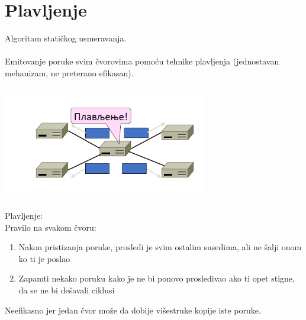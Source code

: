 \documentclass{article} %
\begin{document}
\section{Plavljenje}
Algoritam statičkog usmeravanja.\\
\\
Emitovanje poruke svim čvorovima pomoću tehnike plavljenja (jednostavan mehanizam, ne preterano efikasan).
\begin{center}
		\includegraphics[width=9cm, height=5cm]{plavljenje}\\
\end{center}
Plavljenje:\\

Pravilo na svakom čvoru:
		\begin{enumerate}
			\item Nakon pristizanja poruke, prosledi je svim ostalim susedima, ali ne šalji onom ko ti je poslao
			\item Zapamti nekako poruku kako je ne bi ponovo prosleđivao ako ti opet stigne, da se ne bi dešavali ciklusi
		\end{enumerate}
Neefikasno jer jedan čvor može da dobije višestruke kopije iste poruke.
\end{document}

